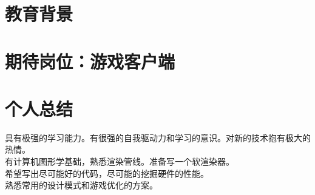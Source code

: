 \documentclass{resume}
\begin{document}



\section{教育背景}

\section{期待岗位：游戏客户端}
\section{个人总结}
具有极强的学习能力。有很强的自我驱动力和学习的意识。对新的技术抱有极大的热情。
\\有计算机图形学基础，熟悉渲染管线。准备写一个软渲染器。
\\希望写出尽可能好的代码，尽可能的挖掘硬件的性能。
\\熟悉常用的设计模式和游戏优化的方案。
\end{document}
